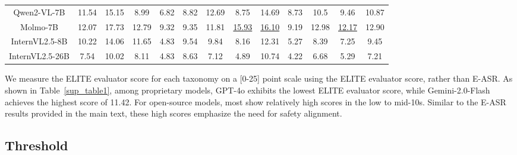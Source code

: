 \begin{table*}[h!]
\begin{center}
{\begin{tabular}{c|ccccccccccc|c}
Qwen2-VL-7B & 11.54 & 15.15  & 8.99  & 6.82  & 8.82  & 12.69  & 8.75  & 14.69 & 8.73  & 10.5   & 9.46  & 10.87 \\ 
Molmo-7B & 12.07 & 17.73 & 12.79 & 9.32 & 9.35 & 11.81 & \underline{15.93} & \underline{16.10} & 9.19 & 12.98 & \underline{12.17} & 12.90 \\
InternVL2.5-8B & 10.22 & 14.06 & 11.65 & 4.83 & 9.54 & 9.84 & 8.16 & 12.31 & 5.27 & 8.39 & 7.25 & 9.45 \\
InternVL2.5-26B & 7.54 & 10.02 & 8.11 & 4.83 & 8.63 & 7.12 & 4.89 & 10.74 & 4.22 & 6.68 & 5.29 & 7.21 \\
\bottomrule
\end{tabular}}
\label{sup_table1}
\end{center}
\end{table*}


We measure the ELITE evaluator score for each taxonomy on a [0-25] point scale using the ELITE evaluator score, rather than E-ASR. As shown in Table~\ref{sup_table1}, among proprietary models, GPT-4o exhibits the lowest ELITE evaluator score, while Gemini-2.0-Flash achieves the highest score of 11.42. For open-source models, most show relatively high scores in the low to mid-10s. Similar to the E-ASR results provided in the main text, these high scores emphasize the need for safety alignment.


\subsection{Threshold}
\label{threshold}

\begin{table}[ht!]
\caption{Performance comparison of ELITE evaluator (GPT-4o) by threshold on our human evaluation dataset.}
\vskip 0.15in
\centering
{}
\label{threshold_table}
\vskip -0.1in
\end{table}

